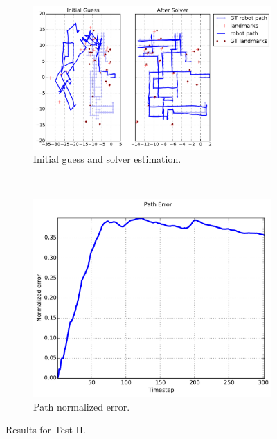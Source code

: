 \begin{figure}[htbp!]
    \centering
    \begin{subfigure}[b]{\estWidth\textwidth}
        \includegraphics[width=\textwidth]{imagenes/tests/known/res_it_20_nl_40_op_100_oa_100_lp_100_ds_300_kw_1.pdf}
        \caption{Initial guess and solver estimation.}
        \label{fig:test-iia}
    \end{subfigure}\\
    \begin{subfigure}[b]{\errorWidth\textwidth}
        \includegraphics[width=\textwidth]{imagenes/tests/known/res_it_20_nl_40_op_100_oa_100_lp_100_ds_300_kw_1_path.pdf}
        \caption{Path normalized error.}
        \label{fig:test-iib}
    \end{subfigure}
    \caption{Results for Test II.}
    \label{fig:test-ii}
\end{figure}

